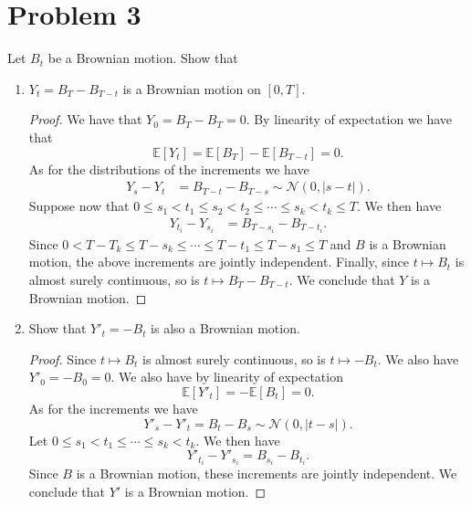 \documentclass[11pt,letterpaper]{report}
\newcommand{\mcal}[1]{\mathcal{#1}}
\newcommand{\E}{\mathbb{E}}
\begin{document}
\section*{Problem 3}
Let $B_t$ be a Brownian motion. Show that
\begin{enumerate}[(a.)]
	\item $Y_t = B_T - B_{T-t}$ is a Brownian motion on $[0,T]$.
	\begin{proof}
		We have that $Y_0 = B_T - B_T = 0$. By linearity of expectation we have that
		\[
		\E[Y_t] = \E[B_T] - \E[B_{T-t}] = 0.
		\]
		As for the distributions of the increments we have
		\begin{align*}
			Y_s - Y_t &= B_{T-t} - B_{T-s} \sim \mcal{N}(0, |s-t|).
		\end{align*}
		Suppose now that $0\leq s_1<t_1\leq s_2<t_2 \leq \cdots \leq s_k<t_k\leq  T$. We then have
		\begin{align*}
			Y_{t_i} - Y_{s_i} &= B_{T-s_i}-B_{T-t_i}.
		\end{align*}
		Since $0< T-T_k\leq T-s_k\leq\cdots \leq T-t_1\leq T-s_1\leq T$ and $B$ is a Brownian motion, the above increments are jointly independent. Finally, since $t\mapsto B_t$ is almost surely continuous, so is $t\mapsto B_T - B_{T-t}$. We conclude that $Y$ is a Brownian motion.
	\end{proof}

	\item Show that $Y'_t = -B_t$ is also a Brownian motion.
	\begin{proof}
		Since $t\mapsto B_t$ is almost surely continuous, so is $t\mapsto -B_t$. We also have $Y'_0 = -B_0 = 0$. We also have by linearity of expectation
		\[
		\E[Y'_t] = -\E[B_t] = 0.
		\]
		As for the increments we have 
		\[
		Y'_s-Y'_t = B_t - B_s \sim \mcal{N}(0, |t-s|).
		\]
		Let $0\leq s_1<t_1\leq \cdots \leq s_k<t_k$. We then have
		\[
		Y'_{t_i} - Y'_{s_i} = B_{s_i} - B_{t_i}.
		\]
		Since $B$ is a Brownian motion, these increments are jointly independent. We conclude that $Y'$ is a Brownian motion.
	\end{proof}


\end{enumerate}
\end{document}
